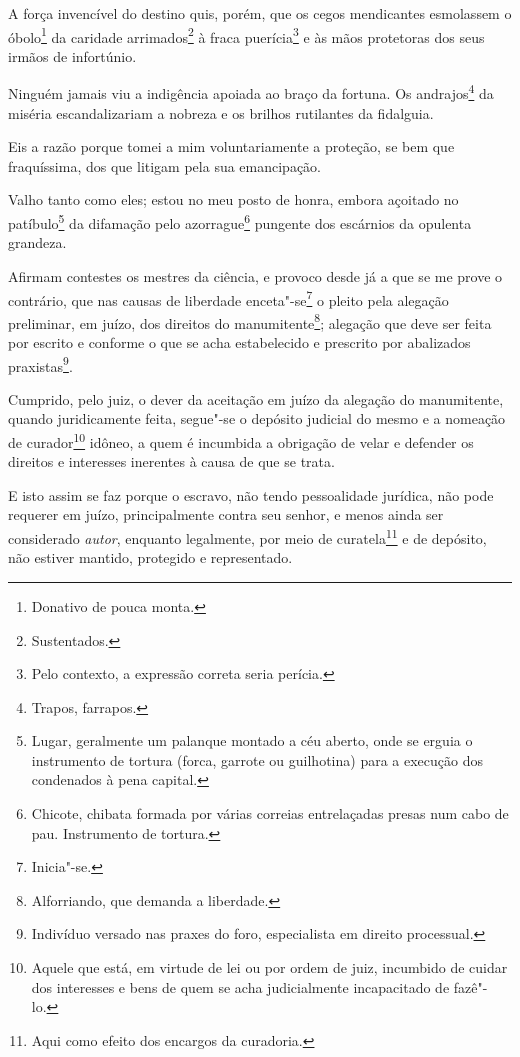 A força invencível do destino quis, porém, que os cegos mendicantes
esmolassem o óbolo\footnote{Donativo de pouca monta.} da caridade
arrimados\footnote{Sustentados.} à fraca puerícia\footnote{Pelo
  contexto, a expressão correta seria perícia.} e às mãos protetoras dos
seus irmãos de infortúnio.

Ninguém jamais viu a indigência apoiada ao braço da fortuna. Os
andrajos\footnote{Trapos, farrapos.} da miséria escandalizariam a
nobreza e os brilhos rutilantes da fidalguia.

Eis a razão porque tomei a mim voluntariamente a proteção, se bem que
fraquíssima, dos que litigam pela sua emancipação.

Valho tanto como eles; estou no meu posto de honra, embora açoitado no
patíbulo\footnote{Lugar, geralmente um palanque montado a céu aberto,
  onde se erguia o instrumento de tortura (forca, garrote ou guilhotina)
  para a execução dos condenados à pena capital.} da difamação pelo
azorrague\footnote{Chicote, chibata formada por várias correias
  entrelaçadas presas num cabo de pau. Instrumento de tortura.} pungente
dos escárnios da opulenta grandeza.

\asterisc

Afirmam contestes os mestres da ciência, e provoco desde já a que se me
prove o contrário, que nas causas de liberdade enceta"-se\footnote{
  Inicia"-se.} o pleito pela alegação preliminar, em juízo, dos direitos
do manumitente\footnote{Alforriando, que demanda a liberdade.};
alegação que deve ser feita por escrito e conforme o que se acha
estabelecido e prescrito por abalizados praxistas\footnote{Indivíduo
  versado nas praxes do foro, especialista em direito processual.}.

Cumprido, pelo juiz, o dever da aceitação em juízo da alegação do
manumitente, quando juridicamente feita, segue"-se o depósito judicial do
mesmo e a nomeação de curador\footnote{Aquele que está, em virtude de
  lei ou por ordem de juiz, incumbido de cuidar dos interesses e bens de
  quem se acha judicialmente incapacitado de fazê"-lo.} idôneo, a quem é
incumbida a obrigação de velar e defender os direitos e interesses
inerentes à causa de que se trata.

E isto assim se faz porque o escravo, não tendo pessoalidade jurídica,
não pode requerer em juízo, principalmente contra seu senhor, e menos
ainda ser considerado \emph{autor}, enquanto legalmente, por meio de
curatela\footnote{Aqui como efeito dos encargos da curadoria.} e de
depósito, não estiver mantido, protegido e representado.

